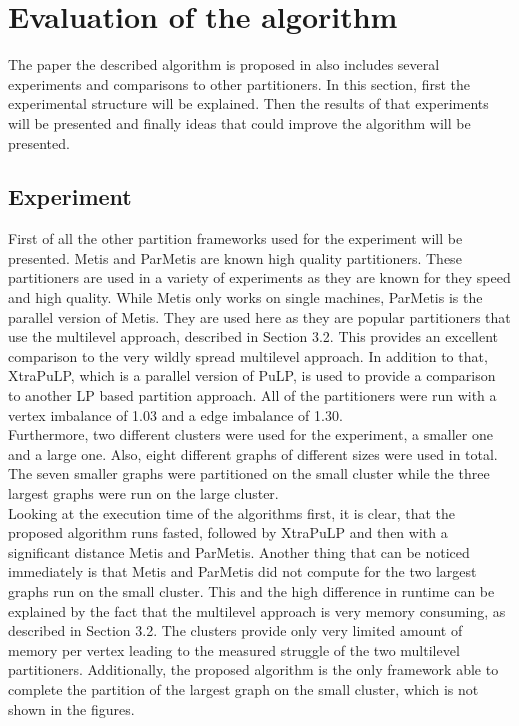\documentclass[acmsmall,nonacm,screen,review]{acmart}
\begin{document}
\section{Evaluation of the algorithm}
The paper the described algorithm is proposed in also includes several experiments and comparisons to other partitioners. In this section, first the experimental structure will be explained. Then the results of that experiments will be presented and finally ideas that could improve the algorithm will be presented.
\subsection{Experiment}
First of all the other partition frameworks used for the experiment will be presented. Metis and ParMetis are known high quality partitioners. These partitioners are used in a variety of experiments as they are known for they speed and high quality. While Metis only works on single machines, ParMetis is the parallel version of Metis. They are used here as they are popular partitioners that use the multilevel approach, described in Section 3.2. This provides an excellent comparison to the very wildly spread multilevel approach. In addition to that, XtraPuLP, which is a parallel version of PuLP, is used to provide a comparison to another LP based partition approach. All of the partitioners were run with a vertex imbalance of 1.03 and a edge imbalance of 1.30.\\
Furthermore, two different clusters were used for the experiment, a smaller one and a large one. Also, eight different graphs of different sizes were used in total. The seven smaller graphs were partitioned on the small cluster while the three largest graphs were run on the large cluster.\\
Looking at the execution time of the algorithms first, it is clear, that the proposed algorithm runs fasted, followed by XtraPuLP and then with a significant distance Metis and ParMetis. Another thing that can be noticed immediately is that Metis and ParMetis did not compute for the two largest graphs run on the small cluster. This and the high difference in runtime can be explained by the fact that the multilevel approach is very memory consuming, as described in Section 3.2. The clusters provide only very limited amount of memory per vertex leading to the measured struggle of the two multilevel partitioners. Additionally, the proposed algorithm is the only framework able to complete the partition of the largest graph on the small cluster, which is not shown in the figures. \\
\end{document}
